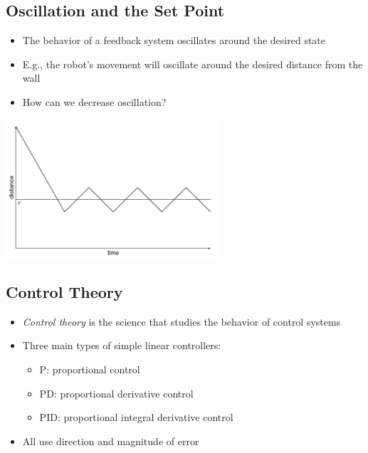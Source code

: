 \documentclass[10pt]{article}
\begin{document}
\subsection*{Oscillation and the Set Point}
\begin{itemize}
	\item The behavior of a feedback system oscillates around the desired state
	\item E.g., the robot's movement will oscillate around the desired distance from the wall
	\item How can we decrease oscillation?
\end{itemize}
\begin{center} 
	\includegraphics*[width=0.6\textwidth]{L2_8.png} 
\end{center}

\subsection*{Control Theory}
\begin{itemize}
	\item \textit{Control theory} is the science that studies the behavior of control systems
	\item Three main types of simple linear controllers:
	\begin{itemize}
        \item P: proportional control
        \item PD: proportional derivative control
        \item PID: proportional integral derivative control
    \end{itemize}
    \item All use direction and magnitude of error
\end{itemize}
\end{document}
